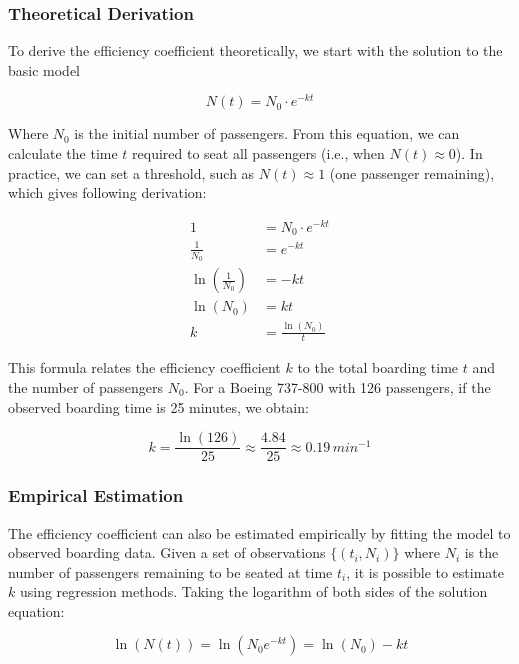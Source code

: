 \documentclass[12pt]{article}
\begin{document}
\subsubsection{Theoretical Derivation}

To derive the efficiency coefficient theoretically, we start with the solution to the basic model

\begin{equation*}
N(t) = N_0 \cdot e^{-kt}
\end{equation*}

Where $N_0$ is the initial number of passengers. From this equation, we can calculate the time $t$ required to seat all passengers (i.e., when $N(t) \approx 0$). In practice, we can set a threshold, such as $N(t) \approx 1$ (one passenger remaining), which gives following derivation:

\begin{align*}
1 &= N_0 \cdot e^{-kt} \\
\frac{1}{N_0} &= e^{-kt} \\
\ln\left(\frac{1}{N_0}\right) &= -kt \\
\ln(N_0) &= kt \\
k &= \frac{\ln(N_0)}{t}
\end{align*}

This formula relates the efficiency coefficient $k$ to the total boarding time $t$ and the number of passengers $N_0$. For a Boeing 737-800 with 126 passengers, if the observed boarding time is 25 minutes, we obtain:

\begin{equation*}
k = \frac{\ln(126)}{25} \approx \frac{4.84}{25} \approx 0.19 \, min^{-1}
\end{equation*}

\subsubsection{Empirical Estimation}

The efficiency coefficient can also be estimated empirically by fitting the model to observed boarding data. Given a set of observations $\{(t_i, N_i)\}$ where $N_i$ is the number of passengers remaining to be seated at time $t_i$, it is possible to estimate $k$ using regression methods. Taking the logarithm of both sides of the solution equation:

\begin{equation}
\ln(N(t)) = \ln(N_0e^{-kt}) = \ln(N_0) - kt
\end{equation}
\end{document}

